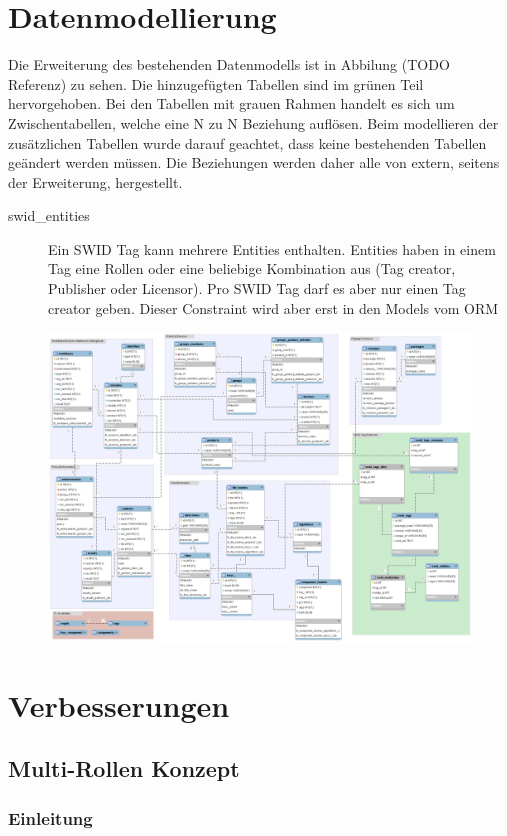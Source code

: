\section{Datenmodellierung}
Die Erweiterung des bestehenden Datenmodells ist in Abbilung (TODO Referenz) zu sehen. Die hinzugefügten Tabellen sind im grünen Teil hervorgehoben. Bei den Tabellen mit grauen Rahmen handelt es sich um Zwischentabellen, welche eine N zu N Beziehung auflösen. Beim modellieren der zusätzlichen Tabellen wurde darauf geachtet, dass keine bestehenden Tabellen geändert werden müssen. Die Beziehungen werden daher alle von extern, seitens der Erweiterung, hergestellt.
\begin{description}
\item [swid\_entities] Ein SWID Tag kann mehrere Entities enthalten. Entities haben in einem Tag eine Rollen oder eine beliebige Kombination aus (Tag creator, Publisher oder Licensor). Pro SWID Tag darf es aber nur einen Tag creator geben. Dieser Constraint wird aber erst in den Models vom \gls{ORM}

\end{description}
\begin{figure}
\centering
\includegraphics[width=0.7\linewidth]{./images/db/database-model}
\caption{}
\label{fig:database-model}
\end{figure}


\section{Verbesserungen}

\subsection{Multi-Rollen Konzept}

\subsubsection{Einleitung}

